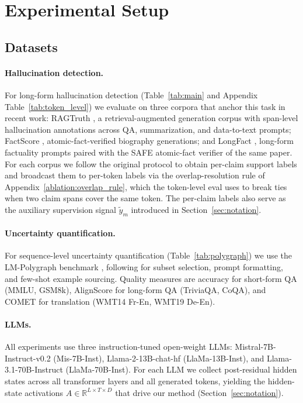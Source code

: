 \section{Experimental Setup}
\label{sec:experiments}

\subsection{Datasets}
\label{sec:datasets}

\paragraph{Hallucination detection.} For long-form hallucination
detection (Table~\ref{tab:main} and Appendix
Table~\ref{tab:token_level})
we evaluate on three corpora that anchor this task in recent work:
RAGTruth \citep{niu2024ragtruth}, a retrieval-augmented
generation corpus with span-level hallucination annotations across
QA, summarization, and data-to-text prompts;
FactScore \citep{min2023}, atomic-fact-verified biography
generations; and LongFact \citep{wei2024}, long-form factuality
prompts paired with the SAFE atomic-fact verifier of the same paper.
For each corpus we follow the original protocol to obtain per-claim
support labels and broadcast them to per-token labels via the
overlap-resolution rule of
Appendix~\ref{ablation:overlap_rule}, which the token-level eval
uses to break ties when two claim spans cover the same token. The
per-claim labels also serve as the auxiliary supervision signal
$\tilde{y}_m$ introduced in Section~\ref{sec:notation}.

\paragraph{Uncertainty quantification.} For sequence-level
uncertainty quantification (Table~\ref{tab:polygraph}) we use the
LM-Polygraph benchmark
\citep{fadeeva2023lmpolygraph,vashurin2025lmpolygraph}, following
\citet{vashurin2025lmpolygraph} for subset selection, prompt
formatting, and few-shot example sourcing. Quality measures are
accuracy for short-form QA (MMLU, GSM8k), AlignScore for long-form
QA (TriviaQA, CoQA), and COMET for translation (WMT14 Fr-En, WMT19 De-En).

\paragraph{LLMs.} All experiments use three instruction-tuned
open-weight LLMs:
Mistral-7B-Instruct-v0.2 \citep{albertqjiang2023} (Mis-7B-Inst),
Llama-2-13B-chat-hf \citep{touvron2023} (LlaMa-13B-Inst), and
Llama-3.1-70B-Instruct \citep{touvron2023} (LlaMa-70B-Inst). For
each LLM we collect post-residual hidden states across all
transformer layers and all generated tokens, yielding the
hidden-state activations
$A \in \mathbb{R}^{L \times T \times D}$ that drive our method
(Section~\ref{sec:notation}).


